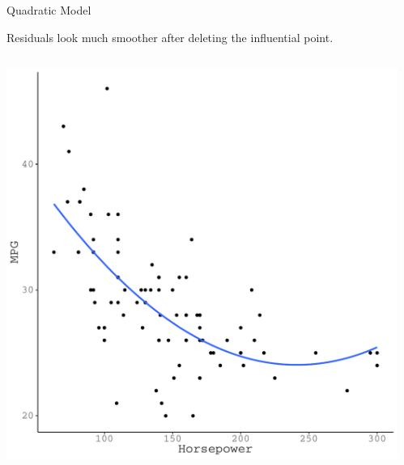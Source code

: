 \documentclass{beamer}\usepackage[]{graphicx}\usepackage[]{color}
\makeatletter
\def\maxwidth{ %
  \ifdim\Gin@nat@width>\linewidth
    \linewidth
  \else
    \Gin@nat@width
  \fi
}
\newenvironment{knitrout}{}{} %
\makeatother
\begin{document}

\begin{frame}{Quadratic Model}

  Residuals look much smoother after deleting the influential point.
  \vb
  \begin{columns}
    \begin{column}{0.5\textwidth}
      
\begin{knitrout}\footnotesize
{}\color{fgcolor}

{\centering \includegraphics[width=\maxwidth]{figure/unnamed-chunk-45-1} 

}



\end{knitrout}

\end{column}

\begin{column}{0.5\textwidth}
      
\begin{knitrout}\footnotesize
{}\color{fgcolor}


\end{knitrout}
\end{column}
\end{columns}
\end{frame}
\end{document}
